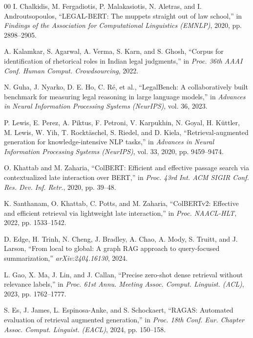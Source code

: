 \documentclass[conference]{IEEEtran}
\begin{document}
\begin{thebibliography}{00}
I. Chalkidis, M. Fergadiotis, P. Malakasiotis, N. Aletras, and I. Androutsopoulos, ``LEGAL-BERT: The muppets straight out of law school,'' in \textit{Findings of the Association for Computational Linguistics (EMNLP)}, 2020, pp. 2898--2905.

A. Kalamkar, S. Agarwal, A. Verma, S. Karn, and S. Ghosh, ``Corpus for identification of rhetorical roles in Indian legal judgments,'' in \textit{Proc. 36th AAAI Conf. Human Comput. Crowdsourcing}, 2022.

N. Guha, J. Nyarko, D. E. Ho, C. R{\'e}, et al., ``LegalBench: A collaboratively built benchmark for measuring legal reasoning in large language models,'' in \textit{Advances in Neural Information Processing Systems (NeurIPS)}, vol. 36, 2023.

P. Lewis, E. Perez, A. Piktus, F. Petroni, V. Karpukhin, N. Goyal, H. K{\"u}ttler, M. Lewis, W. Yih, T. Rockt{\"a}schel, S. Riedel, and D. Kiela, ``Retrieval-augmented generation for knowledge-intensive NLP tasks,'' in \textit{Advances in Neural Information Processing Systems (NeurIPS)}, vol. 33, 2020, pp. 9459--9474.

O. Khattab and M. Zaharia, ``ColBERT: Efficient and effective passage search via contextualized late interaction over BERT,'' in \textit{Proc. 43rd Int. ACM SIGIR Conf. Res. Dev. Inf. Retr.}, 2020, pp. 39--48.

K. Santhanam, O. Khattab, C. Potts, and M. Zaharia, ``ColBERTv2: Effective and efficient retrieval via lightweight late interaction,'' in \textit{Proc. NAACL-HLT}, 2022, pp. 1533--1542.

D. Edge, H. Trinh, N. Cheng, J. Bradley, A. Chao, A. Mody, S. Truitt, and J. Larson, ``From local to global: A graph RAG approach to query-focused summarization,'' \textit{arXiv:2404.16130}, 2024.

L. Gao, X. Ma, J. Lin, and J. Callan, ``Precise zero-shot dense retrieval without relevance labels,'' in \textit{Proc. 61st Annu. Meeting Assoc. Comput. Linguist. (ACL)}, 2023, pp. 1762--1777.

S. Es, J. James, L. Espinosa-Anke, and S. Schockaert, ``RAGAS: Automated evaluation of retrieval augmented generation,'' in \textit{Proc. 18th Conf. Eur. Chapter Assoc. Comput. Linguist. (EACL)}, 2024, pp. 150--158.


\end{thebibliography}
\end{document}
